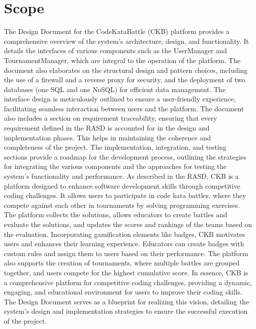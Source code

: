 \section{Scope}
\label{sec:scope}
The Design Document for the CodeKataBattle (CKB) platform provides a comprehensive overview of the system's architecture, 
design, and functionality. It details the interfaces of various components such as the UserManager and TournamentManager, 
which are integral to the operation of the platform.\newline
The document also elaborates on the structural design and pattern choices, 
including the use of a firewall and a reverse proxy for security, and the deployment of 
two databases (one SQL and one NoSQL) for efficient data management.\newline
The interface design is meticulously outlined to ensure a user-friendly experience, 
facilitating seamless interaction between users and the platform.\newline
The document also includes a section on requirement traceability, ensuring that every 
requirement defined in the RASD is accounted for in the design and implementation phases. 
This helps in maintaining the coherence and completeness of the project.\newline
The implementation, integration, and testing sections provide a roadmap for the development process, 
outlining the strategies for integrating the various components and the approaches for testing the system's functionality and performance.\newline
As described in the RASD, CKB is a platform designed to enhance software development skills through competitive coding challenges. 
It allows users to participate in code kata battles, where they compete against each other in tournaments by solving programming exercises. 
The platform collects the solutions, allows educators to create battles and evaluate the solutions, and updates the scores and 
rankings of the teams based on the evaluation.\newline
Incorporating gamification elements like badges, CKB motivates users and enhances their learning experience. 
Educators can create badges with custom rules and assign them to users based on their performance. 
The platform also supports the creation of tournaments, where multiple battles are grouped together, 
and users compete for the highest cumulative score.\newline
In essence, CKB is a comprehensive platform for competitive coding challenges, providing a dynamic, engaging, 
and educational environment for users to improve their coding skills. The Design Document serves as a blueprint 
for realizing this vision, detailing the system's design and implementation strategies to ensure the successful execution of the project.\newline

